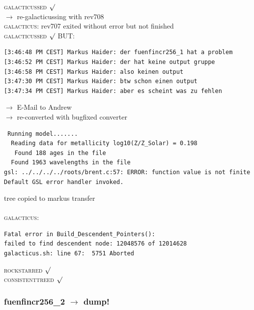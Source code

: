 \textsc{galacticussed} $\surd$ \\
$\rightarrow$ re-galacticussing with rev708 \\
\textsc{galacticus:} rev707 exited without error but not finished \\
\textsc{galacticussed} $\surd$
BUT: 
\begin{verbatim}
[3:46:48 PM CEST] Markus Haider: der fuenfincr256_1 hat a problem
[3:46:52 PM CEST] Markus Haider: der hat keine output gruppe
[3:46:58 PM CEST] Markus Haider: also keinen output
[3:47:30 PM CEST] Markus Haider: btw schon einen output
[3:47:34 PM CEST] Markus Haider: aber es scheint was zu fehlen
\end{verbatim}
$\rightarrow$ E-Mail to Andrew \\
$\rightarrow$ re-converted with bugfixed converter \\
\begin{verbatim}
 Running model....... 
  Reading data for metallicity log10(Z/Z_Solar) = 0.198
   Found 188 ages in the file
  Found 1963 wavelengths in the file
gsl: ../../../../roots/brent.c:57: ERROR: function value is not finite
Default GSL error handler invoked.
\end{verbatim}
tree copied to markus transfer \\
\\ \textsc{galacticus}: 
\begin{verbatim}
Fatal error in Build_Descendent_Pointers():
failed to find descendent node: 12048576 of 12014628
galacticus.sh: line 67:  5751 Aborted  
\end{verbatim}
\textsc{rockstarred} $\surd$ \\ \textsc{consistenttreed} $\surd$

% 
%
%
%
%
%
%
%


\newpage
\subsubsection{fuenfincr256\_2 $\rightarrow$ dump!}

